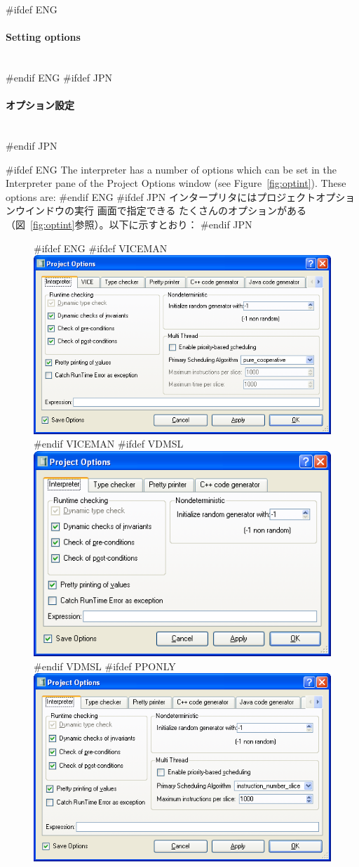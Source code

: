 \documentclass[\pformat,12pt]{article}
\newcommand{\subsubsubsection}[1]{\paragraph{#1}\mbox{}\\}
\newcommand{\guicmd}[1]{{\sf #1}}
\newcommand{\guicmd}[1]{{\gt #1}}
\begin{document}
#ifdef ENG
\subsubsubsection{Setting options}
#endif ENG
#ifdef JPN
\subsubsubsection{オプション設定}
#endif JPN


#ifdef ENG
The interpreter has a number of options which can be set in the 
\guicmd{Interpreter} pane of the \guicmd{Project Options} window (see
Figure~\ref{fig:optint}). These options are:
#endif ENG
#ifdef JPN
インタープリタには\guicmd{プロジェクトオプション}ウインドウの\guicmd{実行} 画面で指定できる
たくさんのオプションがある（図~\ref{fig:optint}参照）。以下に示すとおり：
#endif JPN

\begin{figure}[tbh]
\begin{center}
#ifdef ENG
#ifdef VICEMAN
\includegraphics[width=12.5cm]{interpreterOptions-viceENG.png}
#endif VICEMAN
#ifdef VDMSL
\includegraphics[width=12.5cm]{interpreterOptions-slENG.png}
#endif VDMSL
#ifdef PPONLY
\includegraphics[width=12.5cm]{interpreterOptions-ppENG.png}

\end{center}
\end{figure}
\end{document}
